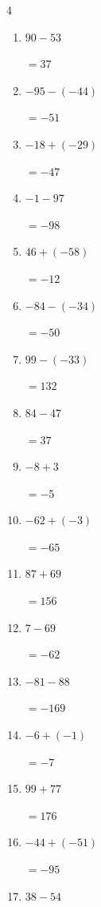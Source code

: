 \begin{multicols}{4}
\begin{enumerate}
        $=6$

  \item $90-53$

        $=37$

  \item $-95-(-44)$

        $=-51$

  \item $-18+(-29)$

        $=-47$

\columnbreak %

  \item $-1-97$

        $=-98$

  \item $46+(-58)$

        $=-12$

  \item $-84-(-34)$

        $=-50$

  \item $99-(-33)$

        $=132$

  \item $84-47$

        $=37$

  \item $-8+3$

        $=-5$

  \item $-62+(-3)$

        $=-65$

  \item $87+69$

        $=156$

  \item $7-69$

        $=-62$

  \item $-81-88$

        $=-169$

  \item $-6+(-1)$

        $=-7$

  \item $99+77$

        $=176$

  \item $-44+(-51)$

        $=-95$

  \item $38-54$


\end{enumerate}
\end{multicols}
